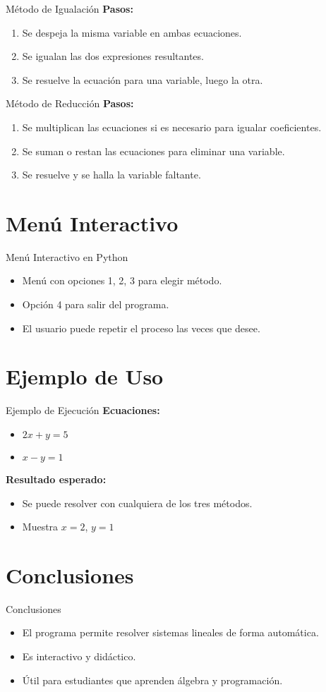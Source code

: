 \documentclass{beamer}
\begin{document}
\begin{frame}{Método de Igualación}
  \textbf{Pasos:}
  \begin{enumerate}
    \item Se despeja la misma variable en ambas ecuaciones.
    \item Se igualan las dos expresiones resultantes.
    \item Se resuelve la ecuación para una variable, luego la otra.
  \end{enumerate}
\end{frame}

\begin{frame}{Método de Reducción}
  \textbf{Pasos:}
  \begin{enumerate}
    \item Se multiplican las ecuaciones si es necesario para igualar coeficientes.
    \item Se suman o restan las ecuaciones para eliminar una variable.
    \item Se resuelve y se halla la variable faltante.
  \end{enumerate}
\end{frame}

\section{Menú Interactivo}
\begin{frame}{Menú Interactivo en Python}
\begin{itemize}
  \item Menú con opciones 1, 2, 3 para elegir método.
  \item Opción 4 para salir del programa.
  \item El usuario puede repetir el proceso las veces que desee.
\end{itemize}
\end{frame}

\section{Ejemplo de Uso}
\begin{frame}{Ejemplo de Ejecución}
\textbf{Ecuaciones:}
\begin{itemize}
  \item \(2x + y = 5\)
  \item \(x - y = 1\)
\end{itemize}
\textbf{Resultado esperado:}
\begin{itemize}
  \item Se puede resolver con cualquiera de los tres métodos.
  \item Muestra \(x = 2\), \(y = 1\)
\end{itemize}
\end{frame}

\section{Conclusiones}
\begin{frame}{Conclusiones}
\begin{itemize}
  \item El programa permite resolver sistemas lineales de forma automática.
  \item Es interactivo y didáctico.
  \item Útil para estudiantes que aprenden álgebra y programación.
\end{itemize}
\end{frame}
\end{document}
